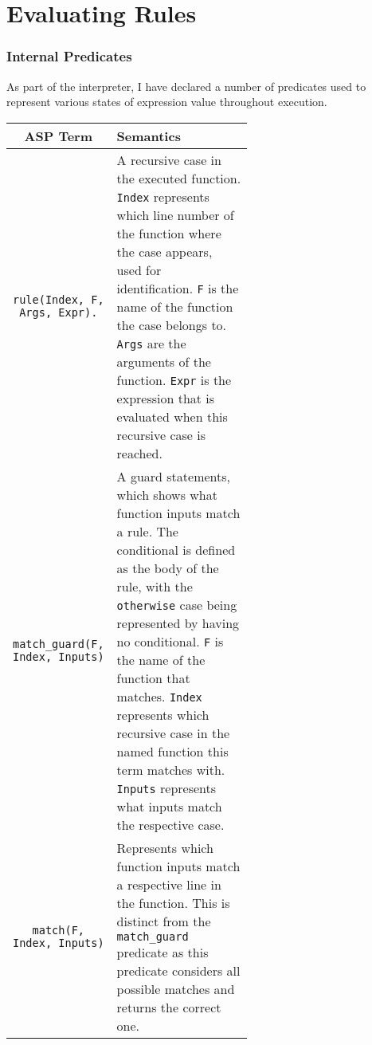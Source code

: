 \section{Evaluating Rules}

\subsubsection{Internal Predicates}
As part of the interpreter, I have declared a number of predicates used to represent various states of expression value throughout execution. 
 
\begin{center}
\begin{tabular}{| c | m{0.6\linewidth} |}
\hline
\textbf{ASP Term} & \textbf{Semantics} \\
\hline
\lstinline!rule(Index, F, Args, Expr).! 
&
\mbox{}\newline
A recursive case in the executed function. \newline
\lstinline!Index! represents which line number of the function where the case appears, used for identification.\newline
\lstinline!F! is the name of the function the case belongs to. \newline
\lstinline!Args! are the arguments of the function.\newline
\lstinline!Expr! is the expression that is evaluated when this recursive case is reached.\newline
\\
\hline
\lstinline!match_guard(F, Index, Inputs)! 
&
\mbox{}\newline
A guard statements, which shows what function inputs match a rule. The conditional is defined as the body of the rule, with the \lstinline!otherwise! case being represented by having no conditional. \newline
\lstinline!F! is the name of the function that matches. \newline
\lstinline!Index! represents which recursive case in the named function this term matches with. \newline
\lstinline!Inputs! represents what inputs match the respective case.\newline
\\
\hline
\lstinline!match(F, Index, Inputs)! 
&
\mbox{}\newline
Represents which function inputs match a respective line in the function. This is distinct from the \lstinline!match_guard! predicate as this predicate considers all possible matches and returns the correct one. \newline

\end{tabular}
\end{center}
